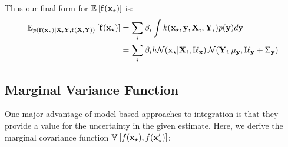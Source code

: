 Thus our final form for $\mathbb{E}_{} \left[ {{\bf{f}}({\bf{x}}_\star)} \right]$ is:
\begin{align}
\mathbb{E}_{ p({\bf{f}}({\bf{x}}_\star)|\mathbf{X}, \mathbf{Y}, {\bf{f}}(\mathbf{X}, \mathbf{Y}))} \left[ {{\bf{f}}({\bf{x}}_\star)} \right] & = \sum_i \beta_i \int k({\bf{x}}_\star, {\bf{y}}, \mathbf{X}_i, \mathbf{Y}_i) p({\bf{y}}) d{\bf{y}} \\
 & = \sum_i \beta_i h \mathcal{N}\!\left( {\bf{x}}_\star  \middle| \mathbf{X}_i, {\text I} {\bf{\ell}}_{\bf{x}} \right) \mathcal{N}\!\left(\mathbf{Y}_i \middle| \mu_{\bf{y}},{\text I} {\bf{\ell}}_{\bf{y}} + \Sigma_{\bf{y}}\right)
\label{eq:marg_mean_closed_form}
\end{align} 



\subsection{Marginal Variance Function}

One major advantage of model-based approaches to integration is that they provide a value for the uncertainty in the given estimate.  Here, we derive the marginal covariance function $\mathbb{V}_{} \left[ {f({\bf{x}}_\star), f({\bf{x}}_\star')} \right]$:

